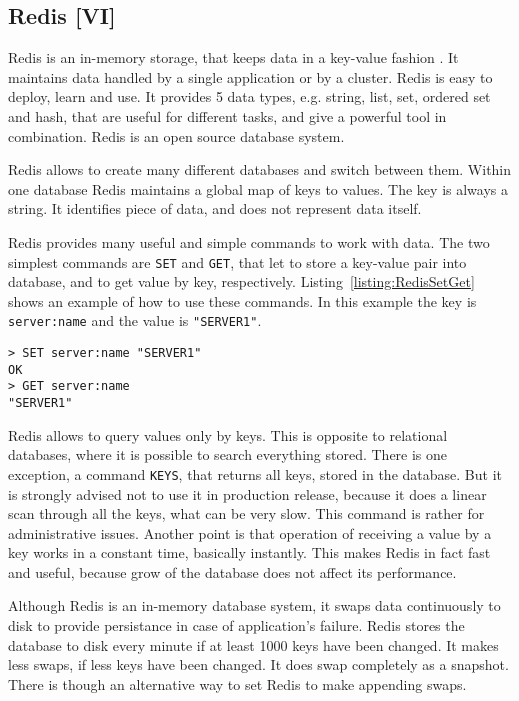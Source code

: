 \subsection{Redis [VI]}
\label{subs:redis}

Redis is an in-memory storage, that keeps data in a key-value fashion \cite{Seguin2012, Redis}.
It maintains data handled by a single application or by a cluster.
Redis is easy to deploy, learn and use.
It provides 5 data types, e.g. string, list, set, ordered set and hash, that are useful for different tasks, and give a powerful tool in combination.
Redis is an open source database system.


Redis allows to create many different databases and switch between them.
Within one database Redis maintains a global map of keys to values.
The key is always a string.
It identifies piece of data, and does not represent data itself.

Redis provides many useful and simple commands to work with data.
The two simplest commands are \lstinline{SET} and \lstinline{GET}, that let to store a key-value pair into database, and to get value by key, respectively.
Listing~\ref{listing:RedisSetGet} shows an example of how to use these commands.
In this example the key is \lstinline{server:name} and the value is \lstinline{"SERVER1"}.

\begin{lstlisting}[float=h, caption=Example of usage of commands SET and GET., label=listing:RedisSetGet]
> SET server:name "SERVER1"
OK
> GET server:name
"SERVER1"
\end{lstlisting}

Redis allows to query values only by keys.
This is opposite to relational databases, where it is possible to search everything stored.
There is one exception, a command \lstinline{KEYS}, that returns all keys, stored in the database.
But it is strongly advised not to use it in production release, because it does a linear scan through all the keys, what can be very slow.
This command is rather for administrative issues.
Another point is that operation of receiving a value by a key works in a constant time, basically instantly.
This makes Redis in fact fast and useful, because grow of the database does not affect its performance.

Although Redis is an in-memory database system, it swaps data continuously to disk to provide persistance in case of application's failure.
Redis stores the database to disk every minute if at least 1000 keys have been changed.
It makes less swaps, if less keys have been changed.
It does swap completely as a snapshot.
There is though an alternative way to set Redis to make appending swaps.

